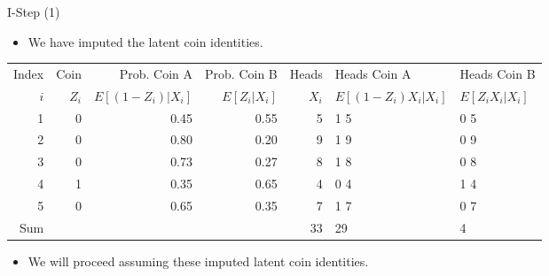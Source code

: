 \documentclass[dvipdfmx,bigger,aspectratio=169]{beamer}
\begin{document}
\begin{frame}[fragile,allowframebreaks,label=,t]{I-Step (1)}
\newpage
\begin{itemize}
\item We have imputed the latent coin identities.
\end{itemize}
\footnotesize
\begin{center}
\begin{tabular}{r|r|rr|r|ll|}
Index & Coin & Prob. Coin A & Prob. Coin B & Heads & Heads Coin A & Heads Coin B\\
\(i\) & \(Z_{i}\) & \(E[(1-Z_{i})\vert X_{i}]\) & \(E[Z_{i}\vert X_{i}]\) & \(X_{i}\) & \(E[(1-Z_{i}) X_{i} \vert X_{i}]\) & \(E[Z_{i} X_{i} \vert X_{i}]\)\\
\hline
1 & 0 & 0.45 & 0.55 & 5 & 1 \texttimes{} 5 & 0 \texttimes{} 5\\
2 & 0 & 0.80 & 0.20 & 9 & 1 \texttimes{} 9 & 0 \texttimes{} 9\\
3 & 0 & 0.73 & 0.27 & 8 & 1 \texttimes{} 8 & 0 \texttimes{} 8\\
4 & 1 & 0.35 & 0.65 & 4 & 0 \texttimes{} 4 & 1 \texttimes{} 4\\
5 & 0 & 0.65 & 0.35 & 7 & 1 \texttimes{} 7 & 0 \texttimes{} 7\\
\hline
Sum &  &  &  & 33 & 29 & 4\\
\end{tabular}
\end{center}
\normalsize
\begin{itemize}
\item We will proceed assuming these imputed latent coin identities.
\end{itemize}
\end{frame}
\end{document}
